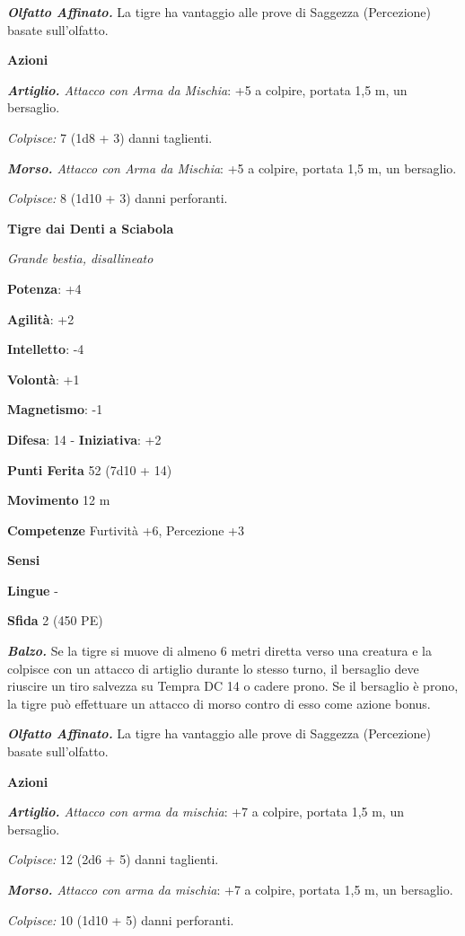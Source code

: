 \begin{multicols}{2}
\emph{\textbf{Olfatto Affinato.}} La tigre ha vantaggio alle prove di
Saggezza (Percezione) basate sull'olfatto.

\textbf{Azioni}

\emph{\textbf{Artiglio.} Attacco con Arma da Mischia}: +5 a colpire,
portata 1,5 m, un bersaglio.

\emph{Colpisce:} 7 (1d8 + 3) danni taglienti.

\emph{\textbf{Morso.} Attacco con Arma da Mischia}: +5 a colpire,
portata 1,5 m, un bersaglio.

\emph{Colpisce:} 8 (1d10 + 3) danni perforanti.

\textbf{Tigre dai Denti a Sciabola}

\emph{Grande bestia, disallineato}

\textbf{Potenza}: +4

\textbf{Agilità}: +2

\textbf{Intelletto}: -4

\textbf{Volontà}: +1

\textbf{Magnetismo}: -1

\textbf{Difesa}: 14 - \textbf{Iniziativa}: +2

\textbf{Punti Ferita} 52 (7d10 + 14)

\textbf{Movimento} 12 m

\textbf{Competenze} Furtività +6, Percezione +3

\textbf{Sensi} 

\textbf{Lingue} -

\textbf{Sfida} 2 (450 PE)

\emph{\textbf{Balzo.}} Se la tigre si muove di almeno 6 metri diretta
verso una creatura e la colpisce con un attacco di artiglio durante lo
stesso turno, il bersaglio deve riuscire un tiro salvezza su Tempra DC 14
o cadere prono. Se il bersaglio è prono, la tigre può effettuare un
attacco di morso contro di esso come azione bonus.

\emph{\textbf{Olfatto Affinato.}} La tigre ha vantaggio alle prove di
Saggezza (Percezione) basate sull'olfatto.

\textbf{Azioni}

\emph{\textbf{Artiglio.} Attacco con arma da mischia}: +7 a colpire,
portata 1,5 m, un bersaglio.

\emph{Colpisce:} 12 (2d6 + 5) danni taglienti.

\emph{\textbf{Morso.} Attacco con arma da mischia}: +7 a colpire,
portata 1,5 m, un bersaglio.

\emph{Colpisce:} 10 (1d10 + 5) danni perforanti.


\end{multicols}
